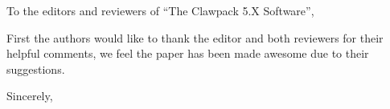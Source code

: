 \documentclass{letter}
\begin{document}
\address{Clawpack Developers}
\signature{Kyle T. Mandli, \\
           Aron J. Ahmadia, \\
           Donna Calhoun, \\
           David George, \\
           Yiannis Hadjimichael, \\ 
           David I. Ketcheson, \\
           Grady I. Lemoine, and \\
           Randall J. LeVeque}

\begin{letter}
{
}

\opening{To the editors and reviewers of ``The Clawpack 5.X Software'',}

First the authors would like to thank the editor and both reviewers for their
helpful comments, we feel the paper has been made awesome due to their
suggestions.

\vspace{4cm}

\closing{Sincerely,}

\end{letter}
\end{document}
